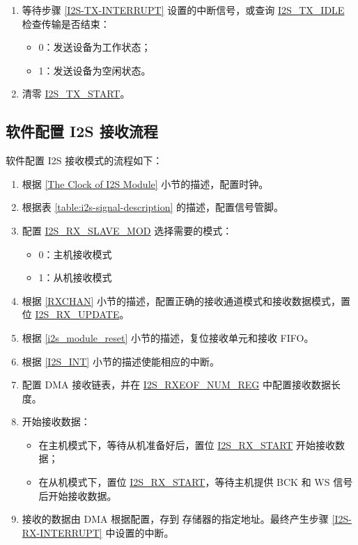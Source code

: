\documentclass[main\_\_CN.tex]{subfiles}
\begin{document}
\begin{enumerate}
    \item 等待步骤 \ref{I2S-TX-INTERRUPT} 设置的中断信号，或查询 \hyperref[fielddesc:I2STXIDLE]{I2S\_TX\_IDLE} 检查传输是否结束：
    \begin{itemize}
        \item 0：发送设备为工作状态；
        \item 1：发送设备为空闲状态。
    \end{itemize}

    \item 清零 \hyperref[fielddesc:I2STXSTART]{I2S\_TX\_START}。
\end{enumerate}
\subsection{软件配置 I2S 接收流程}\label{sec:configure-i2s-as-rx-mode}
软件配置 I2S 接收模式的流程如下：

\begin{enumerate}
    \item 根据 \ref{The Clock of I2S Module} 小节的描述，配置时钟。

    \item 根据表 \ref{table:i2s-signal-description} 的描述，配置信号管脚。

    \item 配置 \hyperref[fielddesc:I2SRXSLAVEMOD]{I2S\_RX\_SLAVE\_MOD} 选择需要的模式：
    \begin{itemize}
        \item 0：主机接收模式
        \item 1：从机接收模式
    \end{itemize}

    \item 根据 \ref{RXCHAN} 小节的描述，配置正确的接收通道模式和接收数据模式，置位 \hyperref[fielddesc:I2SRXUPDATE]{I2S\_RX\_UPDATE}。

    \item 根据 \ref{i2s_module_reset} 小节的描述，复位接收单元和接收 FIFO。
    \item 根据 \ref{I2S_INT} 小节的描述使能相应的中断。\label{I2S-RX-INTERRUPT}

    \item 配置 DMA 接收链表，并在 \hyperref[regdesc:I2SRXEOFNUMREG]{I2S\_RXEOF\_NUM\_REG} 中配置接收数据长度。

    \item 开始接收数据：
    \begin{itemize}
        \item 在主机模式下，等待从机准备好后，置位 \hyperref[fielddesc:I2SRXSTART]{I2S\_RX\_START} 开始接收数据；
        \item 在从机模式下，置位 \hyperref[fielddesc:I2SRXSTART]{I2S\_RX\_START}，等待主机提供 BCK 和 WS 信号后开始接收数据。
    \end{itemize}
    \item 接收的数据由 DMA 根据配置，存到 \chipname{} 存储器的指定地址。最终产生步骤 \ref{I2S-RX-INTERRUPT} 中设置的中断。
\end{enumerate}
\end{document}
